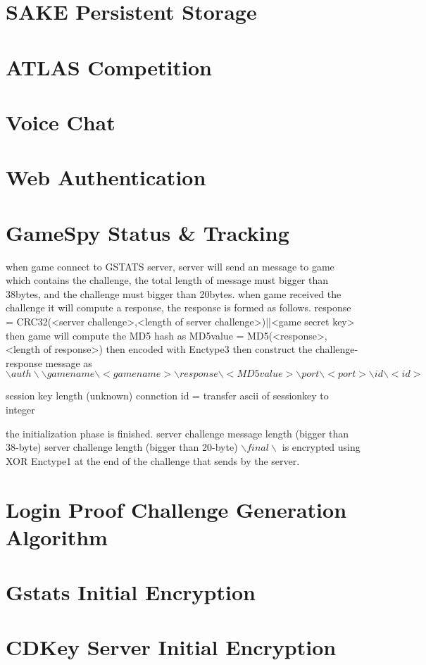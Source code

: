 \documentclass[oneside,titlepage,a4paper]{Definition/retrospy} %
\begin{document}
\chapter{SAKE Persistent Storage}
\chapter{ATLAS Competition}
\chapter{Voice Chat}
\chapter{Web Authentication}

\chapter{GameSpy Status \& Tracking}
when game connect to GSTATS server, server will send an message to game which contains the challenge, the total length of message must bigger than 38bytes, and the challenge must bigger than 20bytes.
when game received the challenge it will compute a response, the response is formed as follows. 
response = CRC32(<server challenge>,<length of server challenge>)||<game secret key>
then game will compute the MD5 hash as MD5value = MD5(<response>,<length of response>)
then encoded with Enctype3
then construct the challenge-response message as $ \backslash auth \backslash \backslash gamename \backslash <gamename>\backslash response \backslash <MD5value> \backslash port \backslash <port> \backslash id \backslash <id> $

session key length (unknown)
connction id = transfer ascii of sessionkey to integer

the initialization phase is finished.
server challenge message length (bigger than 38-byte)
server challenge length (bigger than 20-byte)
$ \backslash final \backslash $ is encrypted using XOR Enctype1 at the end of the challenge that sends by the server.


\begin{appendix}
\chapter{Login Proof Challenge Generation Algorithm}\label{Login Proof Challenge Gerneration Algorithm}
\chapter{Gstats Initial Encryption}
\chapter{CDKey Server Initial Encryption}
\end{appendix}
\end{document}
